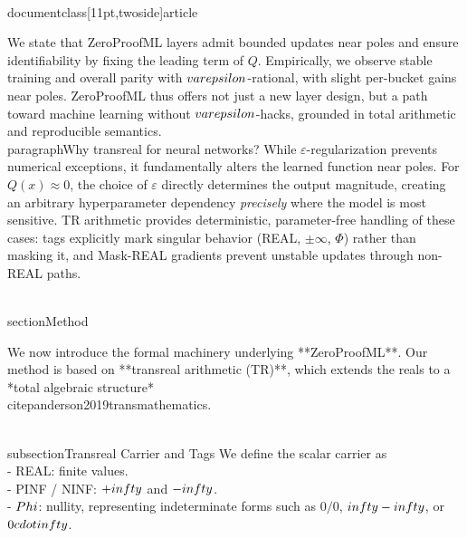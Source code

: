 \\documentclass[11pt,twoside]{article}
\begin{document}
We state that ZeroProofML layers admit bounded updates near poles and ensure identifiability by fixing the leading term of $Q$. Empirically, we observe stable training and overall parity with $\\varepsilon$-rational, with slight per-bucket gains near poles. ZeroProofML thus offers not just a new layer design, but a path toward machine learning without $\\varepsilon$-hacks, grounded in total arithmetic and reproducible semantics.
\\paragraph{Why transreal for neural networks?} While $\varepsilon$-regularization prevents numerical exceptions, it fundamentally alters the learned function near poles. For $Q(x) \approx 0$, the choice of $\varepsilon$ directly determines the output magnitude, creating an arbitrary hyperparameter dependency \emph{precisely} where the model is most sensitive. TR arithmetic provides deterministic, parameter-free handling of these cases: tags explicitly mark singular behavior (REAL, $\pm\infty$, $\Phi$) rather than masking it, and Mask-REAL gradients prevent unstable updates through non-REAL paths.

\\section{Method}

We now introduce the formal machinery underlying **ZeroProofML**. Our method is based on **transreal arithmetic (TR)**, which extends the reals to a *total algebraic structure* \\citep{anderson2019transmathematics}.

\\subsection{Transreal Carrier and Tags}
We define the scalar carrier as
\\[
TR = \\{ (v, t) \\mid v \\in \\mathbb{R} \\cup \\{\\text{NaN}\\}, \\; t \\in \\{\\text{REAL}, \\text{PINF}, \\text{NINF}, \\Phi\\}\\}.
\\]
- REAL: finite values.  \\
- PINF / NINF: $+\\infty$ and $-\\infty$.  \\
- $\\Phi$: nullity, representing indeterminate forms such as $0/0$, $\\infty-\\infty$, or $0 \\cdot \\infty$.  
\end{document}
